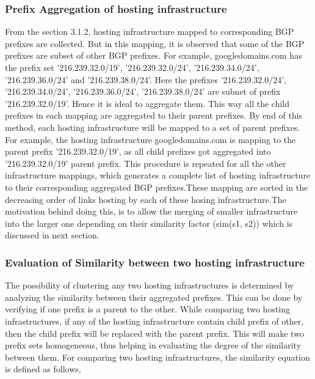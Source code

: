 \subsubsection{Prefix Aggregation of hosting infrastructure}
\noindent From the section 3.1.2, hosting infrastructure mapped to corresponding BGP prefixes are collected. But in this mapping, it is observed that some of the BGP prefixes are subset of other BGP prefixes. For example, googledomains.com has the prefix set ’216.239.32.0/19’, ’216.239.32.0/24’, ’216.239.34.0/24’, ’216.239.36.0/24’ and ’216.239.38.0/24’. Here the prefixes ’216.239.32.0/24’, ’216.239.34.0/24’, ’216.239.36.0/24’, ’216.239.38.0/24’ are subnet of prefix ’216.239.32.0/19’. Hence it is ideal to aggregate them. This way all the child prefixes in each mapping are aggregated to their parent prefixes. By end of this method, each hosting infrastructure will be mapped to a set of parent prefixes. For example, the hosting infrastructure googledomains.com is mapping to the parent prefix ’216.239.32.0/19’, as all child prefixes got aggregated into '216.239.32.0/19' parent prefix. This procedure is repeated for all the other infrastructure mappings, which generates a complete list of hosting infrastructure to their corresponding aggregated BGP prefixes.These mapping are sorted in the decreasing order of links hosting by each of these hosing infrastructure.The motivation behind doing this, is to allow the merging of smaller infrastructure into the larger one depending on their similarity factor (sim(s1, s2)) which is discussed in next section.\\

\subsubsection{Evaluation of Similarity between two hosting infrastructure}
\noindent The possibility of clustering any two hosting infrastructures is determined by analyzing the similarity between their aggregated prefixes. This can be done by verifying if one prefix is a parent to the other. While comparing two hosting infrastructures, if any of the hosting infrastructure contain child prefix of other, then the child prefix will be replaced with the parent prefix. This will make two prefix sets homogeneous, thus helping in evaluating the degree of the similarity between them. For comparing two hosting infrastructures, the similarity equation is defined as follows,\\\\

